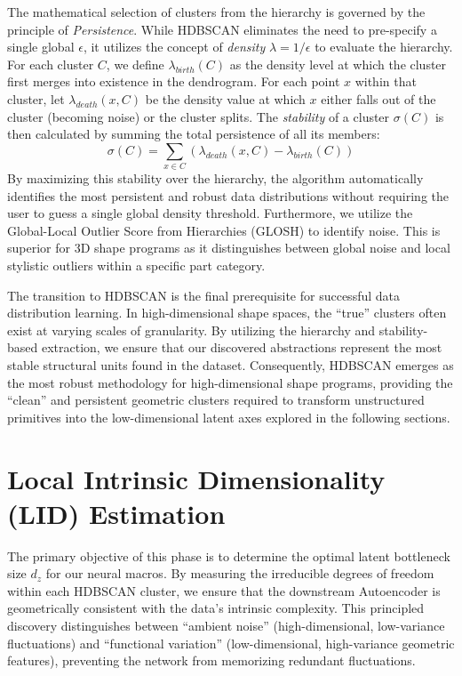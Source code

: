 \documentclass{thesis}
\begin{document}
The mathematical selection of clusters from the hierarchy is governed by the principle of \textit{Persistence}. While HDBSCAN eliminates the need to pre-specify a single global $\epsilon$, it utilizes the concept of \textit{density} $\lambda = 1/\epsilon$ to evaluate the hierarchy. For each cluster $C$, we define $\lambda_{birth}(C)$ as the density level at which the cluster first merges into existence in the dendrogram. For each point $x$ within that cluster, let $\lambda_{death}(x, C)$ be the density value at which $x$ either falls out of the cluster (becoming noise) or the cluster splits. The \textit{stability} of a cluster $\sigma(C)$ is then calculated by summing the total persistence of all its members:
\begin{equation}
    \sigma(C) = \sum_{x \in C} (\lambda_{death}(x, C) - \lambda_{birth}(C))
\end{equation}
By maximizing this stability over the hierarchy, the algorithm automatically identifies the most persistent and robust data distributions without requiring the user to guess a single global density threshold. Furthermore, we utilize the Global-Local Outlier Score from Hierarchies (GLOSH) to identify noise. This is superior for 3D shape programs as it distinguishes between global noise and local stylistic outliers within a specific part category.

The transition to HDBSCAN is the final prerequisite for successful data distribution learning. In high-dimensional shape spaces, the ``true'' clusters often exist at varying scales of granularity. By utilizing the hierarchy and stability-based extraction, we ensure that our discovered abstractions represent the most stable structural units found in the dataset. Consequently, HDBSCAN emerges as the most robust methodology for high-dimensional shape programs, providing the ``clean'' and persistent geometric clusters required to transform unstructured primitives into the low-dimensional latent axes explored in the following sections.

\section{Local Intrinsic Dimensionality (LID) Estimation}
\label{sec:lid_method}

The primary objective of this phase is to determine the optimal latent bottleneck size $d_z$ for our neural macros. By measuring the irreducible degrees of freedom within each HDBSCAN cluster, we ensure that the downstream Autoencoder is geometrically consistent with the data's intrinsic complexity. This principled discovery distinguishes between ``ambient noise'' (high-dimensional, low-variance fluctuations) and ``functional variation'' (low-dimensional, high-variance geometric features), preventing the network from memorizing redundant fluctuations.
\end{document}

